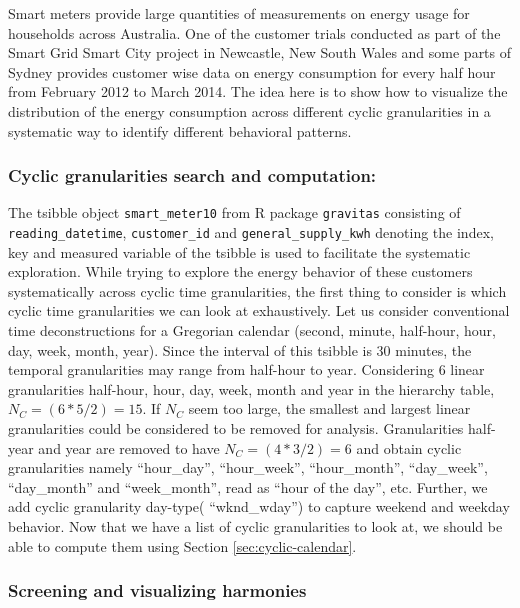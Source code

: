 \documentclass[12pt]{article}
\begin{document}
Smart meters provide large quantities of measurements on energy usage for households across Australia. One of the customer trials \citep{smart-meter} conducted as part of the Smart Grid Smart City project in Newcastle, New South Wales and some parts of Sydney provides customer wise data on energy consumption for every half hour from February 2012 to March 2014. The idea here is to show how to visualize the distribution of the energy consumption across different cyclic granularities in a systematic way to identify different behavioral patterns.

\hypertarget{cyclic-granularities-search-and-computation}{%
\subsubsection{Cyclic granularities search and computation:}\label{cyclic-granularities-search-and-computation}}

The tsibble object \texttt{smart\_meter10} from R package \texttt{gravitas} \citep{R-gravitas} consisting of \texttt{reading\_datetime}, \texttt{customer\_id} and \texttt{general\_supply\_kwh} denoting the index, key and measured variable of the tsibble is used to facilitate the systematic exploration. While trying to explore the energy behavior of these customers systematically across cyclic time granularities, the first thing to consider is which cyclic time granularities we can look at exhaustively. Let us consider conventional time deconstructions for a Gregorian calendar (second, minute, half-hour, hour, day, week, month, year). Since the interval of this tsibble is 30 minutes, the temporal granularities may range from half-hour to year. Considering \(6\) linear granularities half-hour, hour, day, week, month and year in the hierarchy table, \(N_C = (6*5/2) = 15\). If \(N_C\) seem too large, the smallest and largest linear granularities could be considered to be removed for analysis. Granularities half-year and year are removed to have \(N_C = (4*3/2) = 6\) and obtain cyclic granularities namely ``hour\_day'', ``hour\_week'', ``hour\_month'', ``day\_week'', ``day\_month'' and ``week\_month'', read as ``hour of the day'', etc. Further, we add cyclic granularity day-type( ``wknd\_wday'') to capture weekend and weekday behavior. Now that we have a list of cyclic granularities to look at, we should be able to compute them using Section \ref{sec:cyclic-calendar}.

\hypertarget{screening-and-visualizing-harmonies}{%
\subsubsection{Screening and visualizing harmonies}\label{screening-and-visualizing-harmonies}}
\end{document}
